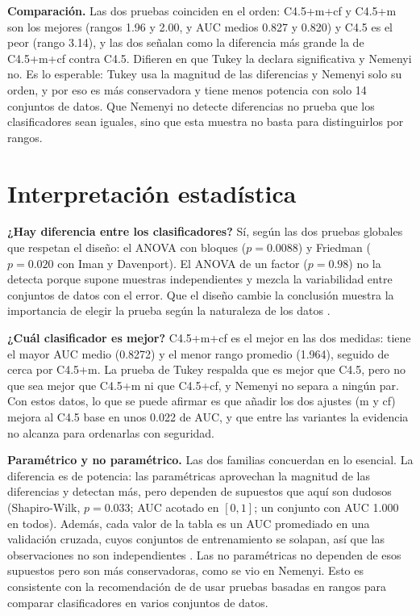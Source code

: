 \documentclass[11pt,letterpaper]{article}
\begin{document}
\textbf{Comparación.} Las dos pruebas coinciden en el orden: C4.5+m+cf y C4.5+m son los mejores (rangos 1.96 y 2.00, y AUC medios 0.827 y 0.820) y C4.5 es el peor (rango 3.14), y las dos señalan como la diferencia más grande la de C4.5+m+cf contra C4.5. Difieren en que Tukey la declara significativa y Nemenyi no. Es lo esperable: Tukey usa la magnitud de las diferencias y Nemenyi solo su orden, y por eso es más conservadora y tiene menos potencia con solo 14 conjuntos de datos. Que Nemenyi no detecte diferencias no prueba que los clasificadores sean iguales, sino que esta muestra no basta para distinguirlos por rangos.

\section{Interpretación estadística}

\textbf{¿Hay diferencia entre los clasificadores?} Sí, según las dos pruebas globales que respetan el diseño: el ANOVA con bloques ($p = 0.0088$) y Friedman ($p = 0.020$ con Iman y Davenport). El ANOVA de un factor ($p = 0.98$) no la detecta porque supone muestras independientes y mezcla la variabilidad entre conjuntos de datos con el error. Que el diseño cambie la conclusión muestra la importancia de elegir la prueba según la naturaleza de los datos \parencite{tecnm2026_tema32}.

\textbf{¿Cuál clasificador es mejor?} C4.5+m+cf es el mejor en las dos medidas: tiene el mayor AUC medio (0.8272) y el menor rango promedio (1.964), seguido de cerca por C4.5+m. La prueba de Tukey respalda que es mejor que C4.5, pero no que sea mejor que C4.5+m ni que C4.5+cf, y Nemenyi no separa a ningún par. Con estos datos, lo que se puede afirmar es que añadir los dos ajustes (m y cf) mejora al C4.5 base en unos 0.022 de AUC, y que entre las variantes la evidencia no alcanza para ordenarlas con seguridad.

\textbf{Paramétrico y no paramétrico.} Las dos familias concuerdan en lo esencial. La diferencia es de potencia: las paramétricas aprovechan la magnitud de las diferencias y detectan más, pero dependen de supuestos que aquí son dudosos (Shapiro-Wilk, $p = 0.033$; AUC acotado en $[0, 1]$; un conjunto con AUC 1.000 en todos). Además, cada valor de la tabla es un AUC promediado en una validación cruzada, cuyos conjuntos de entrenamiento se solapan, así que las observaciones no son independientes \parencite{demsar2006}. Las no paramétricas no dependen de esos supuestos pero son más conservadoras, como se vio en Nemenyi. Esto es consistente con la recomendación de \textcite{demsar2006} de usar pruebas basadas en rangos para comparar clasificadores en varios conjuntos de datos.
\end{document}
